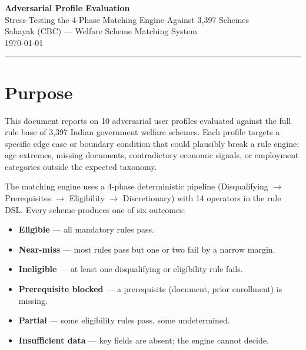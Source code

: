 \documentclass[11pt,a4paper]{article}
\begin{document}
\begin{center}
  {\fontsize{22}{26}\selectfont\bfseries\color{primary}
    Adversarial Profile Evaluation\\[4pt]
  }
  {\fontsize{13}{15}\selectfont\color{secondary}
    Stress-Testing the 4-Phase Matching Engine Against 3{,}397 Schemes
  }\\[12pt]
  {\color{dark}
    Sahayak (CBC) --- Welfare Scheme Matching System\\[4pt]
    \today
  }
\end{center}

\vspace{8pt}
{\color{secondary!40}\rule{\textwidth}{0.6pt}}
\vspace{6pt}

\section{Purpose}

This document reports on 10 adversarial user profiles evaluated against the full rule base of 3{,}397 Indian government welfare schemes. Each profile targets a specific edge case or boundary condition that could plausibly break a rule engine: age extremes, missing documents, contradictory economic signals, or employment categories outside the expected taxonomy.

The matching engine uses a 4-phase deterministic pipeline (Disqualifying $\to$ Prerequisites $\to$ Eligibility $\to$ Discretionary) with 14 operators in the rule DSL. Every scheme produces one of six outcomes:

\begin{itemize}[nosep, leftmargin=1.5em]
  \item \textbf{Eligible} --- all mandatory rules pass.
  \item \textbf{Near-miss} --- most rules pass but one or two fail by a narrow margin.
  \item \textbf{Ineligible} --- at least one disqualifying or eligibility rule fails.
  \item \textbf{Prerequisite blocked} --- a prerequisite (document, prior enrollment) is missing.
  \item \textbf{Partial} --- some eligibility rules pass, some undetermined.
  \item \textbf{Insufficient data} --- key fields are absent; the engine cannot decide.
\end{itemize}
\end{document}

